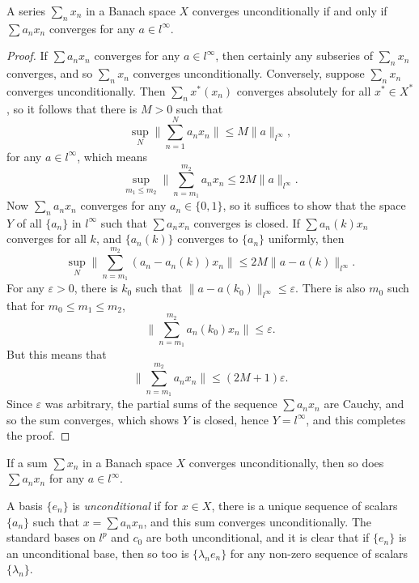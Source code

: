 \begin{theorem}
    A series $\sum_n x_n$ in a Banach space $X$ converges unconditionally if and only if $\sum a_n x_n$ converges for any $a \in l^\infty$.
\end{theorem}
\begin{proof}
    If $\sum a_n x_n$ converges for any $a \in l^\infty$, then certainly any subseries of $\sum_n x_n$ converges, and so $\sum_n x_n$ converges unconditionally. Conversely, suppose $\sum_n x_n$ converges unconditionally. Then $\sum_n x^*(x_n)$ converges absolutely for all $x^* \in X^*$, so it follows that there is $M > 0$ such that
    \[ \sup_N \| \sum_{n = 1}^N a_n x_n \| \leq M \| a \|_{l^\infty}, \]
    for any $a \in l^\infty$, which means
    \[ \sup_{m_1 \leq m_2} \| \sum_{n = m_1}^{m_2} a_n x_n \leq 2M \| a \|_{l^\infty}. \]
    Now $\sum_n a_n x_n$ converges for any $a_n \in \{ 0, 1 \}$, so it suffices to show that the space $Y$ of all $\{ a_n \}$ in $l^\infty$ such that $\sum a_n x_n$ converges is closed. If $\sum a_n(k) x_n$ converges for all $k$, and $\{ a_n(k) \}$ converges to $\{ a_n \}$ uniformly, then
    \[ \sup_N \| \sum_{n = m_1}^{m_2} (a_n - a_n(k)) x_n \| \leq 2M \| a - a(k) \|_{l^\infty}. \]
    For any $\varepsilon > 0$, there is $k_0$ such that $\| a - a(k_0) \|_{l^\infty} \leq \varepsilon$. There is also $m_0$ such that for $m_0 \leq m_1 \leq m_2$,
    \[ \| \sum_{n = m_1}^{m_2} a_n(k_0) x_n \| \leq \varepsilon. \]
    But this means that
    \[ \| \sum_{n = m_1}^{m_2} a_n x_n \| \leq (2M + 1) \varepsilon. \]
    Since $\varepsilon$ was arbitrary, the partial sums of the sequence $\sum a_n x_n$ are Cauchy, and so the sum converges, which shows $Y$ is closed, hence $Y = l^\infty$, and this completes the proof.
\end{proof}

\begin{corollary}
    If a sum $\sum x_n$ in a Banach space $X$ converges unconditionally, then so does $\sum a_n x_n$ for any $a \in l^\infty$.
\end{corollary}

A basis $\{ e_n \}$ is \emph{unconditional} if for $x \in X$, there is a unique sequence of scalars $\{ a_n \}$ such that $x = \sum a_n x_n$, and this sum converges unconditionally. The standard bases on $l^p$ and $c_0$ are both unconditional, and it is clear that if $\{ e_n \}$ is an unconditional base, then so too is $\{ \lambda_n e_n \}$ for any non-zero sequence of scalars $\{ \lambda_n \}$.

